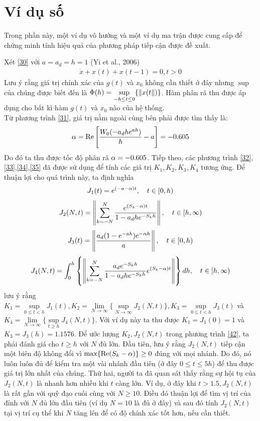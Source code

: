 \section{Ví dụ số}
Trong phần này, một ví dụ vô hướng và một ví dụ ma trận được cung cấp để chứng minh tính hiệu quả của phương pháp tiếp cận được đề xuất.
\begin{vd}
	Xét \eqref{30} với $a = a_d = h =1$ (Yi et al., 2006)
	\begin{align}\label{39}
		\dot{x} +x(t) + x(t-1) = 0, t > 0
	\end{align}
	Lưu ý rằng giá trị chính xác của $g(t)$ và $x_0$ không cần thiết ở đây nhưng $\sup$ của chúng được biết đến là $\Phi(h) = \sup\limits_{-h \le t \le 0} \{\Vert x(t\Vert)\}$. Hàm phân rã thu được áp dụng cho bất kì hàm $g(t)$ và $x_0$ nào của hệ thống.\\
	Từ phương trình \eqref{31}, giá trị nằm ngoài cùng bên phải được tìm thấy là:
	\begin{align}\label{40}
		\alpha = \mathrm{Re} \left[\dfrac{W_0(-a_dhe^{ah})}{h} -a \right] = -0.605
	\end{align}
Do đó ta thu được tốc độ phân rã $\alpha= -0.605$. Tiếp theo, các phương trình \eqref{32}, \eqref{33},\eqref{34},\eqref{35} đã được sử dụng để tính các giá trị $K_1, K_2,K_3,K_4$ tương ứng. Để thuận lợi cho quá trình này, ta định nghĩa
\begin{align}\label{41}
	J_1(t) = e^{(-a-\alpha)t}, \quad t \in [0,h)
\end{align}
%
\begin{align}\label{42}
	J_2(N,t) = \left\Vert \sum_{k=-N}^N \dfrac{e^{(S_k - \alpha)t}}{1-a_dhe^{-S_kh}} \right\Vert, \quad t \in [h,\infty)
\end{align}
%
\begin{align}\label{43}
	J_3(t) = \left \Vert \dfrac{a_d(1-e^{-ah})e^{-\alpha h}}{a}\right \Vert, \quad t \in [0,h)
\end{align}
%
\begin{equation}\label{44}
	J_4(N,t) = \int_0^h \left\{\left\Vert \sum_{k=-N}^N \dfrac{a_de^{-S_kh }}{1-a_dhe^{-S_kh}}e^{(S_k-\alpha)t}\right\Vert \right\}dh , \quad t \in [h,\infty)
\end{equation}
lưu ý rằng $K_1 = \sup \limits_{0 \le t <h}J_1(t), K_2 = \lim\limits_{N\to\infty} \{\sup\limits_{N\to \infty} J_2(N,t)\}, K_3 = \sup\limits_{0 \le t <h}J_3(t)$ và $K_4 = \lim\limits_{N\to \infty}\{\sup\limits_{t \ge h}J_4(N,t) \}$. Với ví dụ này ta thu được $K_1 = J_1(0)=1$ và $K_3= J_3(h) = 1.1576$. Để ước lượng $K_2, J_2(N,t)$ trong phương trình \eqref{42}, ta phải đánh giá cho $t \ge h$ với $N$ đủ lớn. Đầu tiên, lưu ý rằng $J_2(N,t)$ tiếp cận một biên độ không đổi vì $\max\{ \mathrm{Re}(S_k-\alpha) \} \ge 0$ đúng với mọi nhánh. Do đó, nó luôn luôn đủ để kiểm tra một vài nhánh đầu tiên (ở đây $0 \le t \le 5h$) để thu được giá trị lớn nhất của chúng. Thứ hai, người ta đã quan sát thấy rằng sự hội tụ của $J_2(N,t)$ là nhanh hơn nhiều khi $t$ càng lớn. Ví dụ, ở đây khi $t > 1.5, J_2(N,t)$ là rất gần với quỹ đạo cuối cùng với $ N \ge 10$. Điều đó thuận lợi để tìm vị trí của đỉnh với $N$ đủ lớn đầu tiên (ví dụ $N =10$ là đủ ở đây) và sau đó tính $J_2(N,t)$ tại vị trí cụ thể khi $N$ tăng lên để có độ chính xác tốt hơn, nếu cần thiết.\\

\end{vd}
